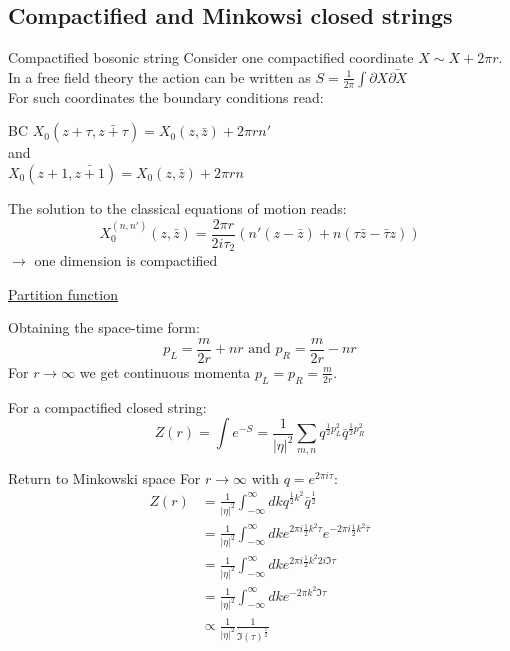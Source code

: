 \documentclass[11pt,aspectratio=169]{beamer}
\begin{document}
\subsection{Compactified and Minkowsi closed strings}

\begin{frame}{Compactified bosonic string}
	Consider one compactified coordinate $X \sim X + 2\pi r$. In a free field theory the action can be written as 
	$S = \frac{1}{2\pi}\int \partial X \bar{\partial X}$ 
	\\
	For such coordinates the boundary conditions read:
	\begin{block}{BC}
		$X_0(z + \tau, \bar{z + \tau}) = X_0(z, \bar{z}) + 2\pi r n'$ 
		\\
		and 
		\\
		$X_0(z + 1, \bar{z + 1}) = X_0(z, \bar{z}) + 2\pi r n$
	\end{block}
	The solution to the classical equations of motion reads:
	\begin{equation}
		X_0^{(n, n')}(z, \bar{z}) = \frac{2\pi r}{2i\tau_2}(n'(z - \bar{z}) + n(\tau\bar{z} - \bar{\tau}z))
	\end{equation}
	$\rightarrow$ one dimension is compactified

\end{frame}


\begin{frame}{\underline{Partition function}}

	Obtaining the space-time form: 
	\begin{equation}
		p_L = \frac{m}{2r} + nr \textrm{ and }
		p_R = \frac{m}{2r} - nr
	\end{equation}
	For $r \rightarrow \infty$ we get continuous momenta $p_L = p_R = \frac{m}{2r}$.

	For a compactified closed string:
	\begin{equation}
		Z(r) = \int e^{-S} = \frac{1}{|\eta|^2} \sum_{m, n} q^{\frac{1}{2}p_L^2}\bar{q}^{\frac{1}{2}p_R^2}
	\end{equation}
	
	
\end{frame}
\begin{frame}{Return to Minkowski space}
	For $r \rightarrow \infty$ with $q = e^{2\pi i \tau}$:
	\begin{align*}
		Z(r) &= \frac{1}{|\eta|^2} \int_{-\infty}^{\infty}dk q^{\frac{1}{2}k^2}\bar{q}^{\frac{1}{2}} \\
		&= \frac{1}{|\eta|^2} \int_{-\infty}^{\infty}dk e^{2\pi i \frac{1}{2}k^2 \tau}e^{-2\pi i \frac{1}{2}k^2 \bar{\tau}} \\
		&= \frac{1}{|\eta|^2} \int_{-\infty}^{\infty}dk e^{2\pi i \frac{1}{2}k^2 2 i \Im{\tau}} \\
		&= \frac{1}{|\eta|^2} \int_{-\infty}^{\infty}dk e^{-2\pi k^2 \Im{\tau}} \\
		&\propto \frac{1}{|\eta|^2} \frac{1}{\Im(\tau)^{\frac{1}{2}}}
	\end{align*}
	
\end{frame}
\end{document}
